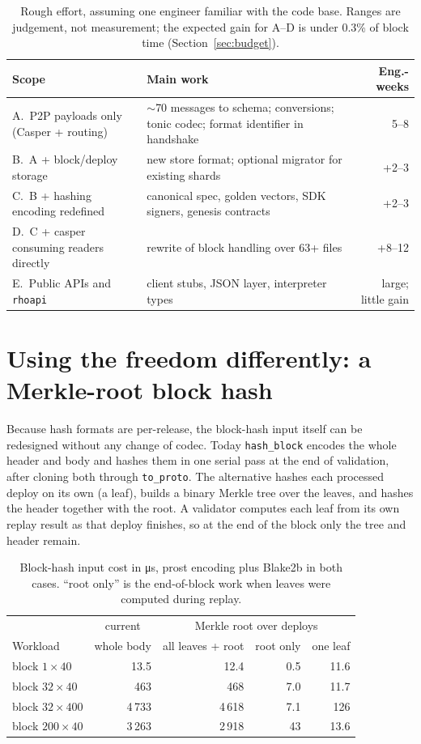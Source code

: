 \documentclass[10pt,a4paper]{article}
\newcommand{\f}[1]{\nolinkurl{#1}}
\begin{document}
\begin{table}[h]
\centering\small
\begin{tabular}{@{}L{6.0cm}L{6.6cm}r@{}}
\toprule
Scope & Main work & Eng.-weeks \\
\midrule
A.\ P2P payloads only (Casper + routing) & $\sim$70 messages to schema; conversions; tonic codec; format identifier in handshake & 5--8 \\
B.\ A + block/deploy storage & new store format; optional migrator for existing shards & +2--3 \\
C.\ B + hashing encoding redefined & canonical spec, golden vectors, SDK signers, genesis contracts & +2--3 \\
D.\ C + casper consuming readers directly & rewrite of block handling over 63+ files & +8--12 \\
E.\ Public APIs and \f{rhoapi} & client stubs, JSON layer, interpreter types & large; little gain \\
\bottomrule
\end{tabular}
\caption{Rough effort, assuming one engineer familiar with the code base. Ranges are judgement,
not measurement; the expected gain for A--D is under 0.3\% of block time
(Section~\ref{sec:budget}).}
\end{table}

\section{Using the freedom differently: a Merkle-root block hash}\label{sec:merkle}

Because hash formats are per-release, the block-hash input itself can be redesigned without any
change of codec. Today \f{hash_block} encodes the whole header and body and hashes them in one serial
pass at the end of validation, after cloning both through \f{to_proto}. The alternative hashes each
processed deploy on its own (a leaf), builds a binary Merkle tree over the leaves, and hashes the
header together with the root. A validator computes each leaf from its own replay result as that
deploy finishes, so at the end of the block only the tree and header remain.

\begin{table}[h]
\centering\small
\begin{tabular}{@{}lrrrr@{}}
\toprule
& \multicolumn{1}{c}{current} & \multicolumn{3}{c}{Merkle root over deploys} \\
\cmidrule(lr){2-2}\cmidrule(lr){3-5}
Workload & whole body & all leaves + root & root only & one leaf \\
\midrule
block $1{\times}40$   & 13.5 & 12.4 & 0.5 & 11.6 \\
block $32{\times}40$  & 463 & 468 & 7.0 & 11.7 \\
block $32{\times}400$ & 4\,733 & 4\,618 & 7.1 & 126 \\
block $200{\times}40$ & 3\,263 & 2\,918 & 43 & 13.6 \\
\bottomrule
\end{tabular}
\caption{Block-hash input cost in \si{\micro\second}, prost encoding plus Blake2b in both cases.
``root only'' is the end-of-block work when leaves were computed during replay.}
\label{tab:merkle}
\end{table}
\end{document}

